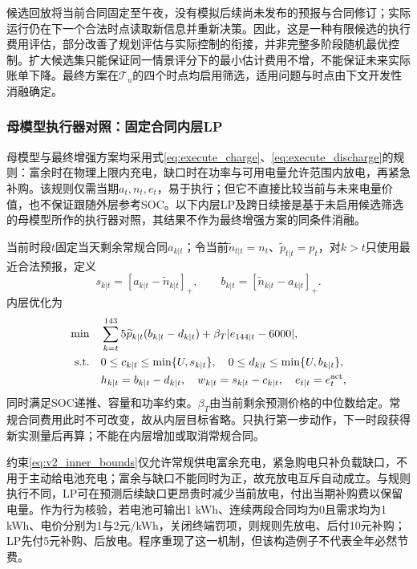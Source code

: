 候选回放将当前合同固定至午夜，没有模拟后续尚未发布的预报与合同修订；实际运行仍在下一个合法时点读取新信息并重新决策。因此，这是一种有限候选的执行费用评估，部分改善了规划评估与实际控制的衔接，并非完整多阶段随机最优控制。扩大候选集只能保证同一情景评分下的最小估计费用不增，不能保证未来实际账单下降。最终方案在$\mathcal T_u$的四个时点均启用筛选，适用问题与时点由下文开发性消融确定。

\subsubsection{母模型执行器对照：固定合同内层LP}

母模型与最终增强方案均采用式\eqref{eq:execute_charge}、\eqref{eq:execute_discharge}的规则：富余时在物理上限内充电，缺口时在功率与可用电量允许范围内放电，再紧急补购。该规则仅需当期$a_t,n_t,e_t$，易于执行；但它不直接比较当前与未来电量价值，也不保证跟随外层参考SOC。以下内层LP及跨日续接是基于未启用候选筛选的母模型所作的执行器对照，其结果不作为最终增强方案的同条件消融。

当前时段$t$固定当天剩余常规合同$a_{k|t}$；令当前$\widetilde n_{t|t}=n_t$、$\widetilde p_{t|t}=p_t$，对$k>t$只使用最近合法预报，定义
\begin{equation}
 s_{k|t}=[a_{k|t}-\widetilde n_{k|t}]_+,\qquad
 b_{k|t}=[\widetilde n_{k|t}-a_{k|t}]_+.
 \label{eq:v2_surplus_deficit}
\end{equation}
内层优化为
\begin{align}
 \min\quad&\sum_{k=t}^{143}5\widetilde p_{k|t}(b_{k|t}-d_{k|t})
       +\beta_T|e_{144|t}-6000|,\label{eq:v2_inner_objective}\\
 \text{s.t.}\quad&0\le c_{k|t}\le\min\{U,s_{k|t}\},\quad
 0\le d_{k|t}\le\min\{U,b_{k|t}\},\label{eq:v2_inner_bounds}\\
 &h_{k|t}=b_{k|t}-d_{k|t},\quad
 w_{k|t}=s_{k|t}-c_{k|t},\quad e_{t|t}=e_t^{\rm act},
 \label{eq:v2_inner_balance}
\end{align}
同时满足SOC递推、容量和功率约束。$\beta_T$由当前剩余预测价格的中位数给定。常规合同费用此时不可改变，故从内层目标省略。只执行第一步动作，下一时段获得新实测量后再算；不能在内层增加或取消常规合同。

约束\eqref{eq:v2_inner_bounds}仅允许常规供电富余充电，紧急购电只补负载缺口，不用于主动给电池充电；富余与缺口不能同时为正，故充放电互斥自动成立。与规则执行不同，LP可在预测后续缺口更昂贵时减少当前放电，付出当期补购费以保留电量。作为行为核验，若电池可输出1 kWh、连续两段合同均为0且需求均为1 kWh、电价分别为1与2元/kWh，关闭终端罚项，则规则先放电、后付10元补购；LP先付5元补购、后放电。程序重现了这一机制，但该构造例子不代表全年必然节费。

